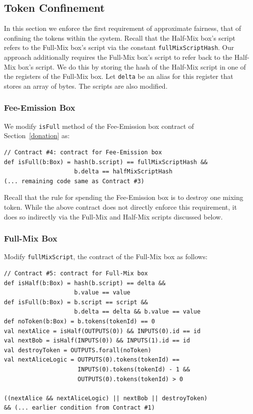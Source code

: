 \documentclass[runningheads]{llncs}
\begin{document}
\subsection{Token Confinement}

In this section we enforce the first requirement of approximate fairness, that of confining the tokens within the system. 
Recall that the Half-Mix box's script refers to the Full-Mix box's script via the constant \texttt{fullMixScriptHash}. Our approach additionally requires the Full-Mix box's script to refer back to the Half-Mix box's script. We do this by storing the hash of the Half-Mix script in one of the registers of the Full-Mix box. Let \texttt{delta} be an alias for this register that stores an array of bytes. The scripts are also modified.

\subsubsection{Fee-Emission Box}
We modify \texttt{isFull} method of the Fee-Emission box contract of Section~\ref{donation} as:

{\small
\begin{Verbatim}[frame=single]
// Contract #4: contract for Fee-Emission box
def isFull(b:Box) = hash(b.script) == fullMixScriptHash && 
                    b.delta == halfMixScriptHash
(... remaining code same as Contract #3)                    
\end{Verbatim}
}

Recall that the rule for spending the Fee-Emission box is to destroy one mixing token. While the above contract does not directly enforce this requirement, it does so indirectly via the Full-Mix and Half-Mix scripts discussed below.

\subsubsection{Full-Mix Box}

Modify \texttt{fullMixScript}, the contract of the Full-Mix box as follows: 
{\small
\begin{Verbatim}[frame=single]
// Contract #5: contract for Full-Mix box
def isHalf(b:Box) = hash(b.script) == delta && 
                    b.value == value
def isFull(b:Box) = b.script == script &&
                    b.delta == delta && b.value == value
def noToken(b:Box) = b.tokens(tokenId) == 0
val nextAlice = isHalf(OUTPUTS(0)) && INPUTS(0).id == id
val nextBob = isHalf(INPUTS(0)) && INPUTS(1).id == id
val destroyToken = OUTPUTS.forall(noToken)
val nextAliceLogic = OUTPUTS(0).tokens(tokenId) == 
                     INPUTS(0).tokens(tokenId) - 1 && 
                     OUTPUTS(0).tokens(tokenId) > 0

((nextAlice && nextAliceLogic) || nextBob || destroyToken) 
&& (... earlier condition from Contract #1)
\end{Verbatim}
}
\end{document}
